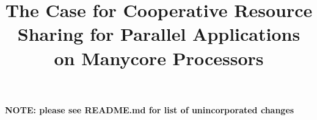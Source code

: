 \documentclass[10pt]{sigplanconf}
\begin{document}
\title{The Case for Cooperative Resource Sharing for Parallel Applications on Manycore Processors}
\maketitle

\textbf{NOTE: please see README.md for list of unincorporated changes}



% 









\end{document}
